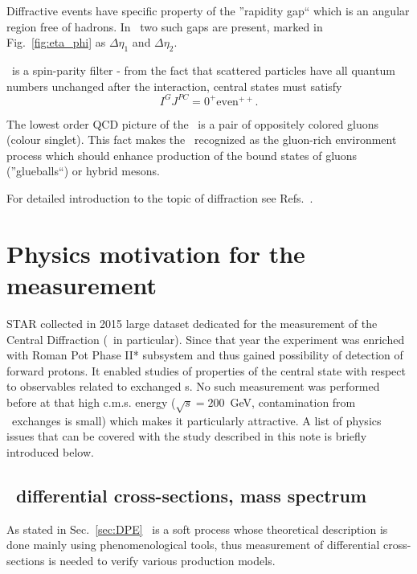 Diffractive events have specific property of the ''rapidity gap`` which is an angular region free of hadrons. In \DPE\ two such gaps are present, marked in Fig.~\ref{fig:eta_phi} as $\Delta\eta_{1}$ and $\Delta\eta_{2}$.%

\DPE\ is a spin-parity filter - from the fact that scattered particles have all quantum numbers unchanged after the interaction, central states must satisfy
\begin{equation}\label{eq:DPE_IGJPC}
 I^{G}J^{PC}=0^{+}\textrm{even}^{++}.
\end{equation}%

The lowest order QCD picture of the \Pomeron\ is a pair of oppositely colored gluons (colour singlet). This fact makes the \DPE\ recognized as the gluon-rich environment process which should enhance production of the bound states of gluons (''glueballs``) or hybrid mesons.

For detailed introduction to the topic of diffraction see Refs.~\cite{pomeronAndQCD,barone}.\vspace*{-20pt}

\section{Physics motivation for the measurement}
STAR collected in 2015 large dataset dedicated for the measurement of the Central Diffraction (\DPE\ in particular). Since that year the experiment was enriched with Roman Pot Phase II* subsystem and thus gained possibility of detection of forward protons. It enabled studies of properties of the central state with respect to observables related to exchanged \Pomeron s. No such measurement was performed before at that high c.m.s. energy ($\sqrt{s}=200$~GeV, contamination from \Reggeon\ exchanges is small) which makes it particularly attractive. A list of physics issues that can be covered with the study described in this note is briefly introduced below.%
%
\subsection{\DPE\ differential cross-sections, mass spectrum}

As stated in Sec.~\ref{sec:DPE} \DPE\ is a soft process whose theoretical description is done mainly using phenomenological tools, thus measurement of differential cross-sections is needed to verify various production models.

